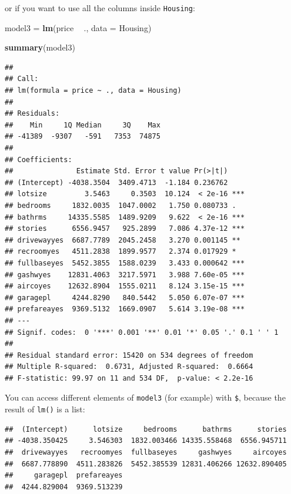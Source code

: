 \documentclass[]{gitbook}
\newenvironment{Shaded}{\begin{snugshade}}{\end{snugshade}}
\newcommand{\DataTypeTok}[1]{\textcolor[rgb]{0.13,0.29,0.53}{#1}}
\newcommand{\KeywordTok}[1]{\textcolor[rgb]{0.13,0.29,0.53}{\textbf{#1}}}
\newcommand{\NormalTok}[1]{#1}
\newcommand{\OperatorTok}[1]{\textcolor[rgb]{0.81,0.36,0.00}{\textbf{#1}}}
\newcommand{\StringTok}[1]{\textcolor[rgb]{0.31,0.60,0.02}{#1}}
\theoremstyle{definition}
\theoremstyle{definition}
\theoremstyle{definition}
\theoremstyle{remark}
\begin{document}
or if you want to use all the columns inside \texttt{Housing}:

\begin{Shaded}
\begin{Highlighting}[]
\NormalTok{model3 =}\StringTok{ }\KeywordTok{lm}\NormalTok{(price }\OperatorTok{~}\StringTok{ }\NormalTok{., }\DataTypeTok{data =}\NormalTok{ Housing)}

\KeywordTok{summary}\NormalTok{(model3)}
\end{Highlighting}
\end{Shaded}

\begin{verbatim}
## 
## Call:
## lm(formula = price ~ ., data = Housing)
## 
## Residuals:
##    Min     1Q Median     3Q    Max 
## -41389  -9307   -591   7353  74875 
## 
## Coefficients:
##               Estimate Std. Error t value Pr(>|t|)    
## (Intercept) -4038.3504  3409.4713  -1.184 0.236762    
## lotsize         3.5463     0.3503  10.124  < 2e-16 ***
## bedrooms     1832.0035  1047.0002   1.750 0.080733 .  
## bathrms     14335.5585  1489.9209   9.622  < 2e-16 ***
## stories      6556.9457   925.2899   7.086 4.37e-12 ***
## drivewayyes  6687.7789  2045.2458   3.270 0.001145 ** 
## recroomyes   4511.2838  1899.9577   2.374 0.017929 *  
## fullbaseyes  5452.3855  1588.0239   3.433 0.000642 ***
## gashwyes    12831.4063  3217.5971   3.988 7.60e-05 ***
## aircoyes    12632.8904  1555.0211   8.124 3.15e-15 ***
## garagepl     4244.8290   840.5442   5.050 6.07e-07 ***
## prefareayes  9369.5132  1669.0907   5.614 3.19e-08 ***
## ---
## Signif. codes:  0 '***' 0.001 '**' 0.01 '*' 0.05 '.' 0.1 ' ' 1
## 
## Residual standard error: 15420 on 534 degrees of freedom
## Multiple R-squared:  0.6731, Adjusted R-squared:  0.6664 
## F-statistic: 99.97 on 11 and 534 DF,  p-value: < 2.2e-16
\end{verbatim}

You can access different elements of \texttt{model3} (for example) with
\texttt{\$}, because the result of \texttt{lm()} is a list:

\begin{Shaded}
\end{Shaded}

\begin{verbatim}
##  (Intercept)      lotsize     bedrooms      bathrms      stories 
## -4038.350425     3.546303  1832.003466 14335.558468  6556.945711 
##  drivewayyes   recroomyes  fullbaseyes     gashwyes     aircoyes 
##  6687.778890  4511.283826  5452.385539 12831.406266 12632.890405 
##     garagepl  prefareayes 
##  4244.829004  9369.513239
\end{verbatim}
\end{document}
